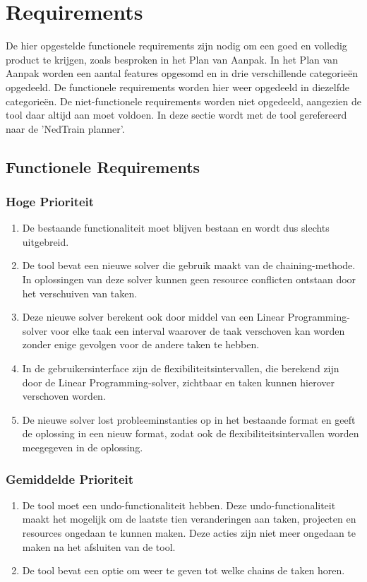 \section{Requirements}
De hier opgestelde functionele requirements zijn nodig om een goed en volledig product te krijgen, zoals besproken in het Plan van Aanpak. In het Plan van Aanpak worden een aantal features opgesomd en in drie verschillende categorie\"en opgedeeld. De functionele requirements worden hier weer opgedeeld in diezelfde categorie\"en. De niet-functionele requirements worden niet opgedeeld, aangezien de tool daar altijd aan moet voldoen. In deze sectie wordt met de tool gerefereerd naar de 'NedTrain planner'.

\subsection{Functionele Requirements}
\subsubsection*{Hoge Prioriteit}
\begin{enumerate}
    \item De bestaande functionaliteit moet blijven bestaan en wordt dus slechts uitgebreid.
    \item De tool bevat een nieuwe solver die gebruik maakt van de chaining-methode. In oplossingen van deze solver kunnen geen resource conflicten ontstaan door het verschuiven van taken.
    \item Deze nieuwe solver berekent ook door middel van een Linear Programming-solver voor elke taak een interval waarover de taak verschoven kan worden zonder enige gevolgen voor de andere taken te hebben.
    \item In de gebruikersinterface zijn de flexibiliteitsintervallen, die berekend zijn door de Linear Programming-solver, zichtbaar en taken kunnen hierover verschoven worden.
    \item De nieuwe solver lost probleeminstanties op in het bestaande format en geeft de oplossing in een nieuw format, zodat ook de flexibiliteitsintervallen worden meegegeven in de oplossing.
\end{enumerate}

\subsubsection*{Gemiddelde Prioriteit}
\begin{enumerate}[resume]
    \item De tool moet een undo-functionaliteit hebben. Deze undo-functionaliteit maakt het mogelijk om de laatste tien veranderingen aan taken, projecten en resources ongedaan te kunnen maken. Deze acties zijn niet meer ongedaan te maken na het afsluiten van de tool.
    \item De tool bevat een optie om weer te geven tot welke chains de taken horen. 
\end{enumerate}

